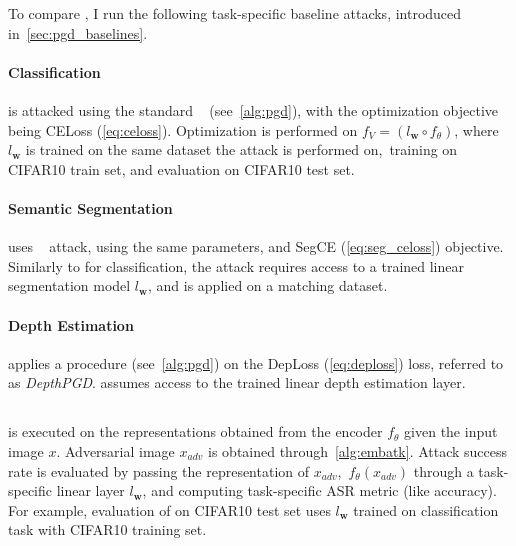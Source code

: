 To compare \EmbedAttack, I run the following task-specific baseline attacks, introduced in~\cref{sec:pgd_baselines}. 

\paragraph{Classification} is attacked using the standard \PGD~\cite{pgd} (see~\cref{alg:pgd}), with the optimization objective being CELoss (\cref{eq:celoss}). Optimization is performed on $f_V=(l_\mathbf{w}\circ f_\theta)$, where $l_\mathbf{w}$ is trained on the same dataset the attack is performed on,~\eg training on CIFAR10 train set, and evaluation on CIFAR10 test set.

\paragraph{Semantic Segmentation} uses \SegPGD~\cite{segpgd} attack, using the same parameters, and SegCE (\cref{eq:seg_celoss}) objective. Similarly to \PGD for classification, the attack requires access to a trained linear segmentation model $l_\mathbf{w}$, and is applied on a matching dataset.

\paragraph{Depth Estimation} applies a \PGD procedure (see~\cref{alg:pgd}) on the DepLoss (\cref{eq:deploss}) loss, referred to as \textit{DepthPGD}. \DepthPGD assumes access to the trained linear depth estimation layer.

\subsection{\EmbedAttack}

\EmbedAttack is executed on the representations obtained from the encoder $f_\theta$ given the input image $x$. Adversarial image $x_{adv}$ is obtained through~\cref{alg:embatk}. Attack success rate is evaluated by passing the representation of $x_{adv}$,~\ie $f_\theta(x_{adv})$ through a task-specific linear layer $l_\mathbf{w}$, and computing task-specific ASR metric (like accuracy). For example, evaluation of \EmbedAttack on CIFAR10 test set uses $l_\mathbf{w}$ trained on classification task with CIFAR10 training set.